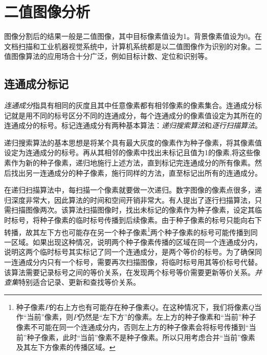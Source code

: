 \section{二值图像分析}

图像分割后的结果一般是二值图像，其中目标像素值设为1。背景像素值设为0。在文档扫描和工业机器视觉系统中，计算机系统都是以二值图像作为识别的对象。二值图像算法的应用场合十分广泛，例如目标计数、定位和识别等。

\subsection{连通成分标记}\label{sec:comp}

\emph{连通成分}指具有相同的灰度且其中任意像素都有相邻像素的像素集合。连通成分标记就是用不同的标号区分不同的连通成分，每个连通成分的像素值设定为其所在的连通成分的标号。标记连通成分有两种基本算法：\emph{递归搜索算法}和\emph{逐行扫描算法}。

递归搜索算法的基本思想是将某个具有最大灰度的像素作为种子像素，将其像素值设定为连通成分的标号。再从其相邻的像素中找出未标记且值为1的像素,将这些像素作为新的种子像素，递归地施行上述方法，直到标记完连通成分的所有像素。然后找出另一连通成分的种子像素，施行同样的方法，直至标记出所有的连通成分。%

在递归扫描算法中，每扫描一个像素就要做一次递归。数字图像的像素点很多，递归深度非常大，因此算法的时间和空间开销非常大。有人提出了逐行扫描算法，只需扫描图像两次。该算法扫描图像时，找出未标记的像素作为种子像素，设定其临时标号，将种子像素的临时标号传播到后续像素。由于种子像素的标号只能向右下转播，故其左下方也可能存在另一个种子像素\footnote{种子像素$P$的右上方也有可能存在种子像素$Q$。在这种情况下，我们将像素$Q$当作“当前”像素，则$P$仍然是“左下方”的像素。左上方的种子像素和“当前”种子像素不可能在同一个连通成分内，否则左上方的种子像素会将标号传播到“当前”种子像素，此时“当前”像素不是种子像素。所以只用考虑合并“当前”像素及其左下方像素的传播区域。}两个种子像素的标号可能传播到同一区域。如果出现这种情况，说明两个种子像素传播的区域在同一个连通成分内，说明这两个临时标号其实标记了同一个连通成分，是两个等价的标号。为了确保同一连通成分内只有一个标号，需要再次扫描图像，将临时标号用其等价标号代替。该算法需要记录标号之间的等价关系，在发现两个标号等价需要更新等价关系。\emph{并查集}特别适合记录、更新和查找等价关系。

